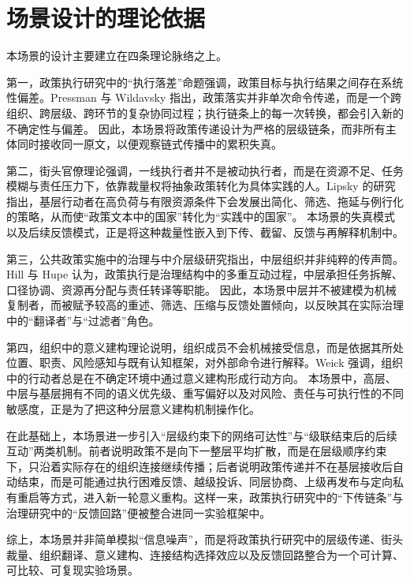 \documentclass{article}
\begin{document}
\section{场景设计的理论依据}

本场景的设计主要建立在四条理论脉络之上。

第一，政策执行研究中的“执行落差”命题强调，政策目标与执行结果之间存在系统性偏差。Pressman 与 Wildavsky 指出，政策落实并非单次命令传递，而是一个跨组织、跨层级、跨环节的复杂协同过程；执行链条上的每一次转换，都会引入新的不确定性与偏差。\cite{PressmanWildavsky1984} 因此，本场景将政策传递设计为严格的层级链条，而非所有主体同时接收同一原文，以便观察链式传播中的累积失真。

第二，街头官僚理论强调，一线执行者并不是被动执行者，而是在资源不足、任务模糊与责任压力下，依靠裁量权将抽象政策转化为具体实践的人。Lipsky 的研究指出，基层行动者在高负荷与有限资源条件下会发展出简化、筛选、拖延与例行化的策略，从而使“政策文本中的国家”转化为“实践中的国家”。\cite{Lipsky2010} 本场景的失真模式以及后续反馈模式，正是将这种裁量性嵌入到下传、截留、反馈与再解释机制中。

第三，公共政策实施中的治理与中介层级研究指出，中层组织并非纯粹的传声筒。Hill 与 Hupe 认为，政策执行是治理结构中的多重互动过程，中层承担任务拆解、口径协调、资源再分配与责任转译等职能。\cite{HillHupe2002} 因此，本场景中层并不被建模为机械复制者，而被赋予较高的重述、筛选、压缩与反馈处置倾向，以反映其在实际治理中的“翻译者”与“过滤者”角色。

第四，组织中的意义建构理论说明，组织成员不会机械接受信息，而是依据其所处位置、职责、风险感知与既有认知框架，对外部命令进行解释。Weick 强调，组织中的行动者总是在不确定环境中通过意义建构形成行动方向。\cite{Weick1995} 本场景中，高层、中层与基层拥有不同的语义优先级、重写偏好以及对风险、责任与可执行性的不同敏感度，正是为了把这种分层意义建构机制操作化。

在此基础上，本场景进一步引入“层级约束下的网络可达性”与“级联结束后的后续互动”两类机制。前者说明政策不是向下一整层平均扩散，而是在层级顺序约束下，只沿着实际存在的组织连接继续传播；后者说明政策传递并不在基层接收后自动结束，而是可能通过执行困难反馈、越级投诉、同层协商、上级再发布与定向私有重启等方式，进入新一轮意义重构。这样一来，政策执行研究中的“下传链条”与治理研究中的“反馈回路”便被整合进同一实验框架中。\cite{PressmanWildavsky1984}\cite{HillHupe2002}\cite{Weick1995}

综上，本场景并非简单模拟“信息噪声”，而是将政策执行研究中的层级传递、街头裁量、组织翻译、意义建构、连接结构选择效应以及反馈回路整合为一个可计算、可比较、可复现实验场景。\cite{PressmanWildavsky1984}\cite{Lipsky2010}\cite{HillHupe2002}\cite{Weick1995}
\end{document}
